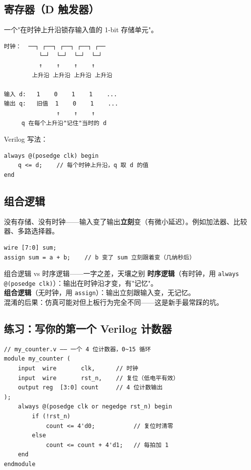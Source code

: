 \documentclass[11pt]{ctexart}
\begin{document}
\subsection{寄存器（D 触发器）}

一个"在时钟上升沿锁存输入值的 1-bit 存储单元"。

\begin{Verbatim}[frame=single,fontsize=\small]
时钟：  ──┐ ┌──┐ ┌──┐ ┌──┐ ┌──
          └─┘  └─┘  └─┘  └─┘
          ↑    ↑    ↑    ↑
        上升沿 上升沿 上升沿 上升沿

输入 d:   1    0    1    1    ...
输出 q:   旧值  1    0    1    ...
               ↑    ↑    ↑
     q 在每个上升沿"记住"当时的 d
\end{Verbatim}

Verilog 写法：
\begin{Verbatim}[frame=single,fontsize=\small]
always @(posedge clk) begin
    q <= d;    // 每个时钟上升沿，q 取 d 的值
end
\end{Verbatim}

\subsection{组合逻辑}

没有存储、没有时钟——输入变了输出\textbf{立刻}变（有微小延迟）。例如加法器、比较器、多路选择器。

\begin{Verbatim}[frame=single,fontsize=\small]
wire [7:0] sum;
assign sum = a + b;    // b 变了 sum 立刻跟着变（几纳秒后）
\end{Verbatim}

\begin{warnbox}{组合逻辑 vs 时序逻辑——一字之差，天壤之别}
\textbf{时序逻辑}（有时钟，用 \texttt{always @(posedge clk)}）：输出在时钟沿才变，有"记忆"。\\
\textbf{组合逻辑}（无时钟，用 \texttt{assign}）：输出立刻跟输入变，无记忆。\\[4pt]
混淆的后果：仿真可能对但上板行为完全不同——这是新手最常踩的坑。
\end{warnbox}

\subsection{练习：写你的第一个 Verilog 计数器}

\begin{Verbatim}[frame=single,fontsize=\small]
// my_counter.v —— 一个 4 位计数器，0~15 循环
module my_counter (
    input  wire       clk,      // 时钟
    input  wire       rst_n,    // 复位（低电平有效）
    output reg  [3:0] count     // 4 位计数输出
);
    always @(posedge clk or negedge rst_n) begin
        if (!rst_n)
            count <= 4'd0;           // 复位时清零
        else
            count <= count + 4'd1;   // 每拍加 1
    end
endmodule
\end{Verbatim}
\end{document}
